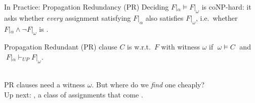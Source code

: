 \documentclass[t]{sdqbeamer}
\begin{document}
\begin{frame}{In Practice: Propagation Redundancy (PR)}
\vspace*{-0.7em}
Deciding $F|_\alpha \models F|_\omega$ is coNP-hard: it asks whether \emph{every} assignment satisfying $F|_\alpha$ also satisfies $F|_\omega$, i.e.\ whether $F|_\alpha \land \lnot F|_\omega$ is .
\begin{block}{Propagation Redundant (PR) clause}
$C$ is  w.r.t.\ $F$ with witness $\omega$ if $\;\omega \models C\;$ and $\;F|_\alpha \vdash_{UP} F|_\omega$.
\end{block}
~\\[1ex]
\vfill
PR clauses need a witness $\omega$. But where do we \emph{find} one cheaply?\\
Up next: , a class of assignments that come .
\end{frame}
\end{document}
